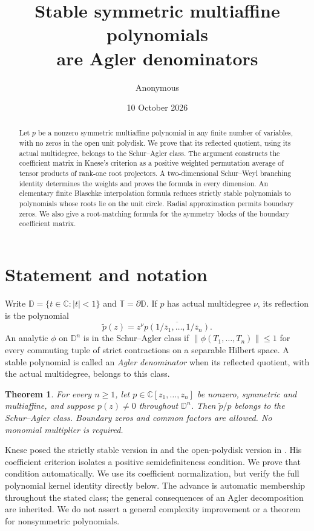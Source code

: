 \documentclass[11pt,a4paper]{article}
\title{Stable symmetric multiaffine polynomials\protect\\are Agler denominators}
\author{Anonymous}
\date{10 October 2026}
\newtheorem{theorem}{Theorem}
\theoremstyle{remark}\newtheorem{remark}[theorem]{Remark}
\newcommand{\D}{\mathbb D}
\newcommand{\T}{\mathbb T}
\newcommand{\C}{\mathbb C}
\begin{document}
\maketitle
\begin{abstract}
Let $p$ be a nonzero symmetric multiaffine polynomial in any finite number of variables, with no zeros in the open unit polydisk. We prove that its reflected quotient, using its actual multidegree, belongs to the Schur--Agler class. The argument constructs the coefficient matrix in Knese's criterion as a positive weighted permutation average of tensor products of rank-one root projectors. A two-dimensional Schur--Weyl branching identity determines the weights and proves the formula in every dimension. An elementary finite Blaschke interpolation formula reduces strictly stable polynomials to polynomials whose roots lie on the unit circle. Radial approximation permits boundary zeros. We also give a root-matching formula for the symmetry blocks of the boundary coefficient matrix.
\end{abstract}

\section{Statement and notation}
Write $\D=\{t\in\C:|t|<1\}$ and $\T=\partial\D$. If $p$ has actual multidegree $\nu$, its reflection is the polynomial
\[
 \widetilde p(z)=z^\nu\overline{p(1/\overline z_1,\ldots,1/\overline z_n)}.
\]
An analytic $\phi$ on $\D^n$ is in the Schur--Agler class if
$\|\phi(T_1,\ldots,T_n)\|\leq1$ for every commuting tuple of strict contractions on a separable Hilbert space.
A stable polynomial is called an \emph{Agler denominator} when its reflected quotient, with the actual multidegree, belongs to this class.

\begin{theorem}\label{thm:main}
For every $n\geq1$, let $p\in\C[z_1,\ldots,z_n]$ be nonzero, symmetric and multiaffine, and suppose $p(z)\neq0$ throughout $\D^n$. Then $\widetilde p/p$ belongs to the Schur--Agler class. Boundary zeros and common factors are allowed. No monomial multiplier is required.
\end{theorem}

Knese posed the strictly stable version in \cite[Question 1.4]{knese2010} and the open-polydisk version in \cite[Problem 3]{kneseSurvey}. His coefficient criterion \cite[Theorem 3.3 and (3.5)]{knese2010} isolates a positive semidefiniteness condition. We prove that condition automatically. We use its coefficient normalization, but verify the full polynomial kernel identity directly below. The advance is automatic membership throughout the stated class; the general consequences of an Agler decomposition are inherited. We do not assert a general complexity improvement or a theorem for nonsymmetric polynomials.
\end{document}
